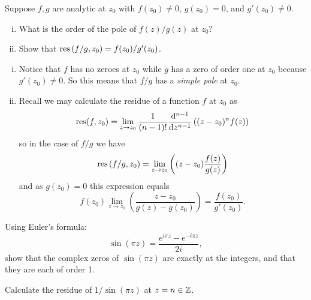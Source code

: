 \documentclass[12pt]{memoir}
\begin{document}
\begin{Ej}
    Suppose $f,g$ are analytic at $z_0$ with $f(z_0)\neq 0$, $g(z_0)=0$, and $g'(z_0)\neq 0$.
    \begin{enumerate}[i)]
        \itemsep=-0.4em
        \item What is the order of the pole of $f(z)/g(z)$ at $z_0$?
        \item Show that $\operatorname*{res}\left(f/g,z_0\right)={f(z_0)}/{g'(z_0)}$.
    \end{enumerate}
\end{Ej}

\begin{ptcbr}
    \begin{enumerate}[i)]
        \itemsep=-0.4em
        \item Notice that $f$ has no zeroes at $z_0$ while $g$ has a zero of order one at $z_0$ because $g'(z_0)\neq 0$. So this means that $f/g$ has a \emph{simple pole} at $z_0$. 
        \item Recall we may calculate the residue of a function $f$ at $z_0$ as 
        $$\operatorname*{res}(f,z_0)=\lim_{z\to z_0}\frac{1}{(n-1)!}\dv[n-1]{z}\left((z-z_0)^nf(z)\right)$$
        so in the case of $f/g$ we have 
        $$\operatorname*{res}\left(f/g,z_0\right)=\lim_{z\to z_0}\left((z-z_0)\frac{f(z)}{g(z)}\right)$$
        and as $g(z_0)=0$ this expression equals 
        $$f(z_0)\lim_{z\to z_0}\left(\frac{z-z_0}{g(z)-g(z_0)}\right)=\frac{f(z_0)}{g'(z_0)}.$$
    \end{enumerate}
\end{ptcbr}

\begin{Ej}
    Using Euler's formula: 
    $$\sin(\pi z)=\frac{e^{i\pi z}-e^{-i\pi z}}{2i},$$
    show that the complex zeros of $\sin(\pi z)$ are exactly at the integers, and that they
are each of order 1.\par 
Calculate the residue of $1/\sin(\pi z)$ at $z= n\in\mathbb{Z}$.
\end{Ej}
\end{document}

